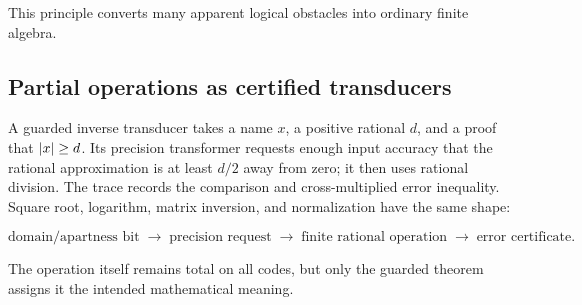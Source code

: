This principle converts many apparent logical obstacles into ordinary finite
algebra.

\subsection{Partial operations as certified transducers}

A guarded inverse transducer takes a name \(x\), a positive rational \(d\),
and a proof that \(\left|x\right|\ge d\).  Its precision transformer requests enough
input accuracy that the rational approximation is at least \(d/2\) away from
zero; it then uses rational division.  The trace records the comparison and
cross-multiplied error inequality.  Square root, logarithm, matrix inversion,
and normalization have the same shape:

\[
\text{domain/apartness bit}
\;\longrightarrow\;
\text{precision request}
\;\longrightarrow\;
\text{finite rational operation}
\;\longrightarrow\;
\text{error certificate}.
\]

The operation itself remains total on all codes, but only the guarded theorem
assigns it the intended mathematical meaning.
